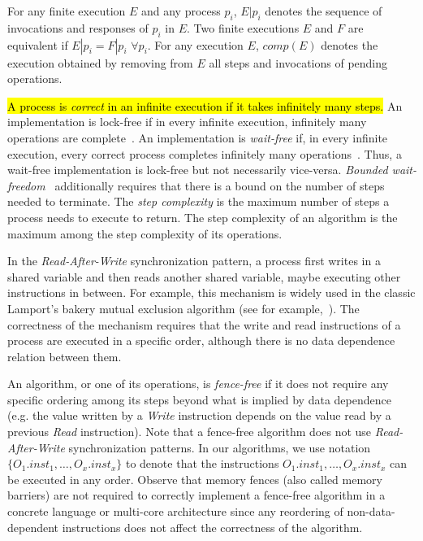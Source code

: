 For any finite execution \(E\) and any process \(p_i\), \(E|p_i\) denotes the sequence of invocations and responses of \(p_i\) in \(E\). Two finite executions \(E\) and \(F\) are equivalent if \(E|p_i = F|p_i\) \(\forall p_i\). For any execution \(E\), \(comp(E)\) denotes the execution obtained by removing from \(E\) all steps and invocations of pending operations.

\hl{A process is \emph{correct} in an infinite execution if it takes infinitely many steps.} An implementation is lock-free if in every infinite execution, infinitely many operations are complete~\cite{DBLP_journals_toplas_HerlihyW90}. An implementation is \emph{wait-free} if, in every infinite execution, every correct process completes infinitely many operations~\cite {DBLP_journals_toplas_Herlihy91}. Thus, a wait-free implementation is lock-free but not necessarily vice-versa. \emph{Bounded wait-freedom}~\cite{DBLP_conf_spaa_Herlihy91} additionally requires that there is a bound on the number of steps needed to terminate. The \emph{step complexity} is the maximum number of steps a process needs to execute to return. The step complexity of an algorithm is the maximum among the step complexity of its operations.

In the \emph{Read-After-Write} synchronization pattern, a process first writes in a shared variable and then reads another shared variable, maybe executing other instructions in between. For example, this mechanism is widely used in the classic Lamport's bakery mutual exclusion algorithm (see for example,~\cite {DBLP_books_daglib_0020056}). The correctness of the mechanism requires that the write and read instructions of a process are executed in a specific order, although there is no data dependence relation between them.

An algorithm, or one of its operations, is \emph{fence-free} if it does not require any specific ordering among its steps beyond what is implied by data dependence (e.g. the value written by a \emph{Write} instruction depends on the value read by a previous \emph{Read} instruction). Note that a fence-free algorithm does not use \emph{Read-After-Write} synchronization patterns. In our algorithms, we use notation \(\{O_1.inst_1, \ldots, O_x.inst_x\}\) to denote that the instructions \(O_1.inst_1, \ldots, O_x.inst_x\) can be executed in any order. Observe that memory fences (also called memory barriers) are not required to correctly implement a fence-free algorithm in a concrete language or multi-core architecture since any reordering of non-data-dependent instructions does not affect the correctness of the algorithm.

